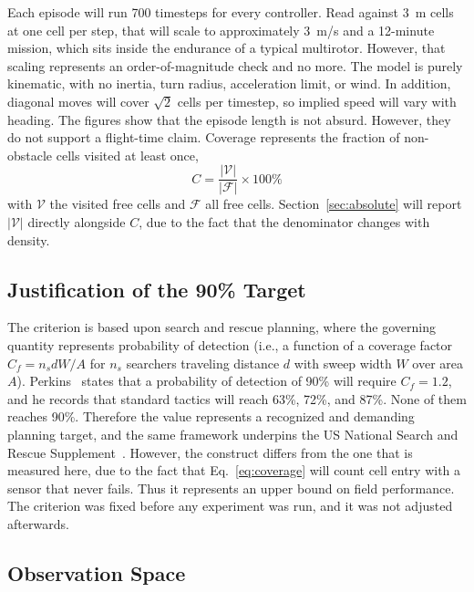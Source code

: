 \documentclass[a4paper, 10pt, conference]{ieeeconf}
\begin{document}
Each episode will run 700 timesteps for every controller. Read against 3~m cells at one cell per step, that will scale to approximately 3~m/s and a 12-minute mission, which sits inside the endurance of a typical multirotor. However, that scaling represents an order-of-magnitude check and no more. The model is purely kinematic, with no inertia, turn radius, acceleration limit, or wind. In addition, diagonal moves will cover $\sqrt{2}$ cells per timestep, so implied speed will vary with heading. The figures show that the episode length is not absurd. However, they do not support a flight-time claim.
Coverage represents the fraction of non-obstacle cells visited at least once,
\begin{equation}\label{eq:coverage}
    C = \frac{|\mathcal{V}|}{|\mathcal{F}|} \times 100\%
\end{equation}
with $\mathcal{V}$ the visited free cells and $\mathcal{F}$ all free
cells. Section~\ref{sec:absolute} will report $|\mathcal{V}|$ directly
alongside $C$, due to the fact that the denominator changes with
density.

\subsection{Justification of the 90\% Target}\label{sec:threshold}

The criterion is based upon search and rescue planning, where the
governing quantity represents probability of detection (i.e., a
function of a coverage factor $C_{f} = n_{s}dW/A$ for $n_s$ searchers
traveling distance $d$ with sweep width $W$ over area $A$).
Perkins~\cite{perkins2013} states that a probability of detection of
90\% will require $C_f = 1.2$, and he records that standard tactics
will reach 63\%, 72\%, and 87\%. None of them reaches 90\%. Therefore
the value represents a recognized and demanding planning target, and
the same framework underpins the US National Search and Rescue
Supplement~\cite{nss2018}. However, the construct differs from the one
that is measured here, due to the fact that Eq.~\ref{eq:coverage} will
count cell entry with a sensor that never fails. Thus it represents an
upper bound on field performance. The criterion was fixed before any
experiment was run, and it was not adjusted afterwards.

\subsection{Observation Space}\label{sec:obs}
\end{document}
